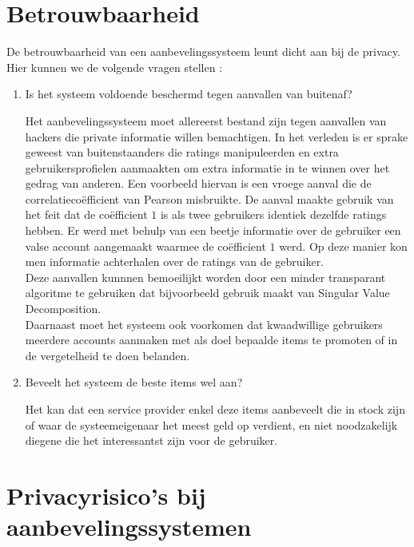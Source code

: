 \section{Betrouwbaarheid}
De betrouwbaarheid van een aanbevelingssysteem leunt dicht aan bij de privacy. Hier kunnen we de volgende vragen stellen : 

\begin{enumerate}
\item Is het systeem voldoende beschermd tegen aanvallen van buitenaf?

 Het aanbevelingssysteem moet allereerst bestand zijn tegen aanvallen van hackers die private informatie willen bemachtigen. In het verleden is er sprake geweest van buitenstaanders die ratings manipuleerden en extra gebruikersprofielen aanmaakten om extra informatie in te winnen over het gedrag van anderen. Een voorbeeld hiervan is een vroege aanval die de correlatieco\"efficient van Pearson misbruikte. De aanval maakte gebruik van het feit dat de co\"efficient $1$ is als twee gebruikers identiek dezelfde ratings hebben. Er werd met behulp van een beetje informatie over de gebruiker een valse account aangemaakt waarmee de co\"efficient $1$ werd. Op deze manier kon men informatie achterhalen over de ratings van de gebruiker.\\
 
 Deze aanvallen kunnnen bemoeilijkt worden door een minder transparant algoritme te gebruiken dat bijvoorbeeld gebruik maakt van Singular Value Decomposition. \\Daarnaast moet het systeem ook voorkomen dat kwaadwillige gebruikers meerdere accounts aanmaken met als doel bepaalde items te promoten of in de vergetelheid te doen belanden. 
 
\item Beveelt het systeem de beste items wel aan?

 Het kan dat een service provider enkel deze items aanbeveelt die in stock zijn of waar de systeemeigenaar het meest geld op verdient, en niet noodzakelijk diegene die het interessantst zijn voor de gebruiker. 
\end{enumerate}

\section{Privacyrisico's bij aanbevelingssystemen}
\label{sec:risicos}

